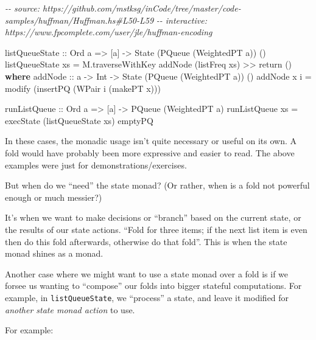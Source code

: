 \documentclass[]{article}
\newenvironment{Shaded}{}{}
\newcommand{\CommentTok}[1]{\textcolor[rgb]{0.38,0.63,0.69}{\textit{#1}}}
\newcommand{\DataTypeTok}[1]{\textcolor[rgb]{0.56,0.13,0.00}{#1}}
\newcommand{\FunctionTok}[1]{\textcolor[rgb]{0.02,0.16,0.49}{#1}}
\newcommand{\KeywordTok}[1]{\textcolor[rgb]{0.00,0.44,0.13}{\textbf{#1}}}
\newcommand{\NormalTok}[1]{#1}
\newcommand{\OperatorTok}[1]{\textcolor[rgb]{0.40,0.40,0.40}{#1}}
\newcommand{\OtherTok}[1]{\textcolor[rgb]{0.00,0.44,0.13}{#1}}
\begin{document}
\begin{Shaded}
\begin{Highlighting}[]
\CommentTok{{-}{-} source: https://github.com/mstksg/inCode/tree/master/code{-}samples/huffman/Huffman.hs\#L50{-}L59}
\CommentTok{{-}{-} interactive: https://www.fpcomplete.com/user/jle/huffman{-}encoding}

\OtherTok{listQueueState ::} \DataTypeTok{Ord}\NormalTok{ a }\OtherTok{=>}\NormalTok{ [a] }\OtherTok{{-}>} \DataTypeTok{State}\NormalTok{ (}\DataTypeTok{PQueue}\NormalTok{ (}\DataTypeTok{WeightedPT}\NormalTok{ a)) ()}
\NormalTok{listQueueState xs }\OtherTok{=}\NormalTok{ M.traverseWithKey addNode (listFreq xs) }\OperatorTok{>>} \FunctionTok{return}\NormalTok{ ()}
  \KeywordTok{where}
\OtherTok{    addNode ::}\NormalTok{ a }\OtherTok{{-}>} \DataTypeTok{Int} \OtherTok{{-}>} \DataTypeTok{State}\NormalTok{ (}\DataTypeTok{PQueue}\NormalTok{ (}\DataTypeTok{WeightedPT}\NormalTok{ a)) ()}
\NormalTok{    addNode x i }\OtherTok{=}\NormalTok{ modify (insertPQ (}\DataTypeTok{WPair}\NormalTok{ i (makePT x)))}

\OtherTok{runListQueue ::} \DataTypeTok{Ord}\NormalTok{ a }\OtherTok{=>}\NormalTok{ [a] }\OtherTok{{-}>} \DataTypeTok{PQueue}\NormalTok{ (}\DataTypeTok{WeightedPT}\NormalTok{ a)}
\NormalTok{runListQueue xs }\OtherTok{=}\NormalTok{ execState (listQueueState xs) emptyPQ}
\end{Highlighting}
\end{Shaded}

In these cases, the monadic usage isn't quite necessary or useful on its own. A
fold would have probably been more expressive and easier to read. The above
examples were just for demonstrations/exercises.

But when do we ``need'' the state monad? (Or rather, when is a fold not powerful
enough or much messier?)

It's when we want to make decisions or ``branch'' based on the current state, or
the results of our state actions. ``Fold for three items; if the next list item
is even then do this fold afterwards, otherwise do that fold''. This is when the
state monad shines as a monad.

Another case where we might want to use a state monad over a fold is if we
forsee us wanting to ``compose'' our folds into bigger stateful computations.
For example, in \texttt{listQueueState}, we ``process'' a state, and leave it
modified for \emph{another state monad action} to use.

For example:
\end{document}
